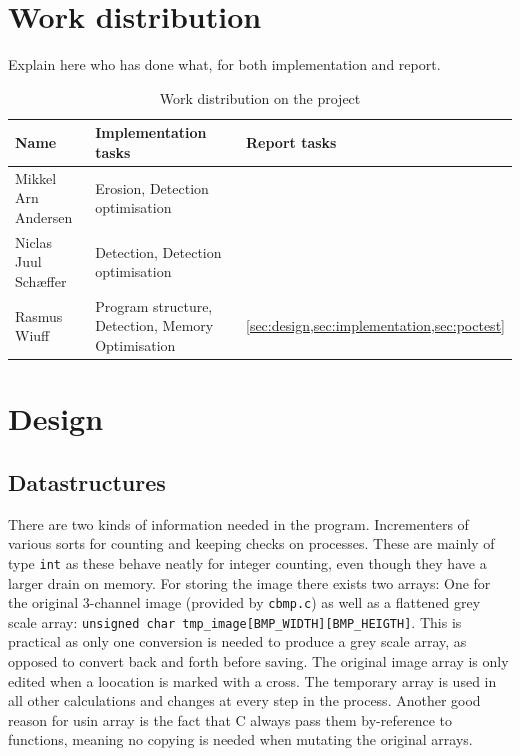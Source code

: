 \documentclass[a4paper, english]{article}
\numberwithin{equation}{section}
\begin{document}
\section{Work distribution}
Explain here who has done what, for both implementation and report.
\begin{table}[H]
    \centering
    \caption{Work distribution on the project}\label{tbl:ansvar}
    \begin{tabular}{lll}
        \toprule
        Name                 & Implementation tasks                              & Report tasks                                     \\
        \midrule
        Mikkel Arn Andersen  & Erosion, Detection optimisation                   &                                                  \\
        Niclas Juul Schæffer & Detection, Detection optimisation                 &                                                  \\
        Rasmus Wiuff         & Program structure, Detection, Memory Optimisation & \cref{sec:design,sec:implementation,sec:poctest} \\
        \bottomrule
    \end{tabular}
\end{table}
\section{Design}\label{sec:design}
\subsection{Datastructures}
There are two kinds of information needed in the program. Incrementers of various sorts for counting and keeping checks on processes. These are mainly of type \texttt{int} as these behave neatly for integer counting, even though they have a larger drain on memory. For storing the image there exists two arrays: One for the original 3-channel image (provided by \texttt{cbmp.c}) as well as a flattened grey scale array: \texttt{unsigned char tmp\_image[BMP\_WIDTH][BMP\_HEIGTH]}.
This is practical as only one conversion is needed to produce a grey scale array, as opposed to convert back and forth before saving. The original image array is only edited when a loocation is marked with a cross. The temporary array is used in all other calculations and changes at every step in the process. Another good reason for usin array is the fact that C always pass them by-reference to functions, meaning no copying is needed when mutating the original arrays.
\end{document}
